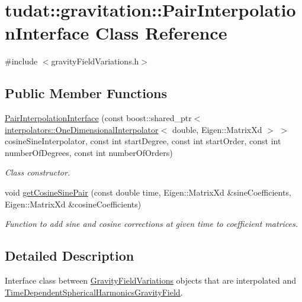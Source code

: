 \hypertarget{classtudat_1_1gravitation_1_1PairInterpolationInterface}{}\section{tudat\+:\+:gravitation\+:\+:Pair\+Interpolation\+Interface Class Reference}
\label{classtudat_1_1gravitation_1_1PairInterpolationInterface}


{\ttfamily \#include $<$gravity\+Field\+Variations.\+h$>$}

\subsection*{Public Member Functions}
\begin{DoxyCompactItemize}
\item 
\hyperlink{classtudat_1_1gravitation_1_1PairInterpolationInterface_a0389d333f9beec7ca7d2ac893ea105f7}{Pair\+Interpolation\+Interface} (const boost\+::shared\+\_\+ptr$<$ \hyperlink{classtudat_1_1interpolators_1_1OneDimensionalInterpolator}{interpolators\+::\+One\+Dimensional\+Interpolator}$<$ double, Eigen\+::\+Matrix\+Xd $>$ $>$ cosine\+Sine\+Interpolator, const int start\+Degree, const int start\+Order, const int number\+Of\+Degrees, const int number\+Of\+Orders)
\begin{DoxyCompactList}\small\item\em Class constructor. \end{DoxyCompactList}\item 
void \hyperlink{classtudat_1_1gravitation_1_1PairInterpolationInterface_ab550f64bdb760f1cf3562610c716ed99}{get\+Cosine\+Sine\+Pair} (const double time, Eigen\+::\+Matrix\+Xd \&sine\+Coefficients, Eigen\+::\+Matrix\+Xd \&cosine\+Coefficients)
\begin{DoxyCompactList}\small\item\em Function to add sine and cosine corrections at given time to coefficient matrices. \end{DoxyCompactList}\end{DoxyCompactItemize}


\subsection{Detailed Description}
Interface class between \hyperlink{classtudat_1_1gravitation_1_1GravityFieldVariations}{Gravity\+Field\+Variations} objects that are interpolated and \hyperlink{classtudat_1_1gravitation_1_1TimeDependentSphericalHarmonicsGravityField}{Time\+Dependent\+Spherical\+Harmonics\+Gravity\+Field}.

